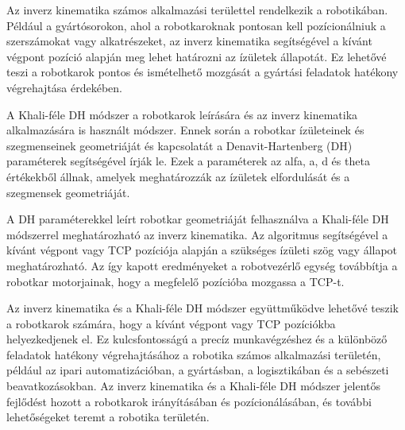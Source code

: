 Az inverz kinematika számos alkalmazási területtel rendelkezik a robotikában. Például a gyártósorokon, ahol a robotkaroknak pontosan kell pozícionálniuk a szerszámokat vagy alkatrészeket, az inverz kinematika segítségével a kívánt végpont pozíció alapján meg lehet határozni az ízületek állapotát. Ez lehetővé teszi a robotkarok pontos és ismételhető mozgását a gyártási feladatok hatékony végrehajtása érdekében.

A Khali-féle DH módszer a robotkarok leírására és az inverz kinematika alkalmazására is használt módszer. Ennek során a robotkar ízületeinek és szegmenseinek geometriáját és kapcsolatát a Denavit-Hartenberg (DH) paraméterek segítségével írják le. Ezek a paraméterek az alfa, a, d és theta értékekből állnak, amelyek meghatározzák az ízületek elfordulását és a szegmensek geometriáját.

A DH paraméterekkel leírt robotkar geometriáját felhasználva a Khali-féle DH módszerrel meghatározható az inverz kinematika. Az algoritmus segítségével a kívánt végpont vagy TCP pozíciója alapján a szükséges ízületi szög vagy állapot meghatározható. Az így kapott eredményeket a robotvezérlő egység továbbítja a robotkar motorjainak, hogy a megfelelő pozícióba mozgassa a TCP-t.

Az inverz kinematika és a Khali-féle DH módszer együttműködve lehetővé teszik a robotkarok számára, hogy a kívánt végpont vagy TCP pozíciókba helyezkedjenek el. Ez kulcsfontosságú a precíz munkavégzéshez és a különböző feladatok hatékony végrehajtásához a robotika számos alkalmazási területén, például az ipari automatizációban, a gyártásban, a logisztikában és a sebészeti beavatkozásokban. Az inverz kinematika és a Khali-féle DH módszer jelentős fejlődést hozott a robotkarok irányításában és pozícionálásában, és további lehetőségeket teremt a robotika területén.